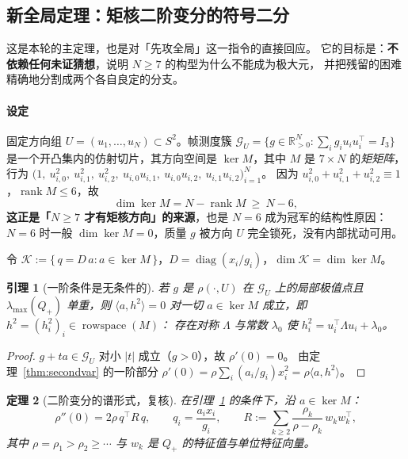 \documentclass[UTF8,11pt]{ctexart}
\newtheorem{theorem}{定理}[section]
\newtheorem{lemma}[theorem]{引理}
\theoremstyle{definition}
\newcommand{\Lam}{\Lambda}
\newcommand{\rank}{\operatorname{rank}}
\newcommand{\R}{\mathbb{R}}
\begin{document}
\subsection{新全局定理：矩核二阶变分的符号二分}\label{sec:r17:dichotomy}

这是本轮的主定理，也是对「先攻全局」这一指令的直接回应。
它的目标是：\textbf{不依赖任何未证猜想}，说明 $N\ge7$ 的构型为什么不能成为极大元，
并把残留的困难精确地分割成两个各自良定的分支。

\paragraph{设定}
固定方向组 $U=(u_1,\dots,u_N)\subset S^2$。帧测度簇
$\mathcal G_U=\{g\in\R^N_{>0}:\sum_ig_iu_iu_i^\top=I_3\}$
是一个开凸集内的仿射切片，其方向空间是
$\ker M$，其中 $M$ 是 $7\times N$ 的\emph{矩矩阵}，
行为 $\bigl(1,\ u_{i,0}^2,\ u_{i,1}^2,\ u_{i,2}^2,\ u_{i,0}u_{i,1},\ u_{i,0}u_{i,2},\ u_{i,1}u_{i,2}\bigr)_{i=1}^N$。
因为 $u_{i,0}^2+u_{i,1}^2+u_{i,2}^2\equiv1$，$\rank M\le6$，故
\begin{equation}\label{eq:kerdim}
\dim\ker M=N-\rank M\ \ge\ N-6 ,
\end{equation}
\textbf{这正是「$N\ge7$ 才有矩核方向」的来源}，也是 $N=6$ 成为冠军的结构性原因：
$N=6$ 时一般 $\dim\ker M=0$，质量 $g$ 被方向 $U$ 完全锁死，没有内部扰动可用。

令 $\mathcal K:=\{\,q=D\,a:a\in\ker M\,\}$，$D=\operatorname{diag}(x_i/g_i)$，$\dim\mathcal K=\dim\ker M$。

\begin{lemma}[一阶条件是无条件的]\label{lem:firstorder}
若 $g$ 是 $\rho(\cdot,U)$ 在 $\mathcal G_U$ 上的局部极值点且 $\lambda_{\max}(Q_+)$ 单重，则
$\langle a,h^2\rangle=0$ 对一切 $a\in\ker M$ 成立，即 $h^2=(h_i^2)_i\in\operatorname{rowspace}(M)$：
存在对称 $\Lam$ 与常数 $\lambda_0$ 使 $h_i^2=u_i^\top\!\Lam u_i+\lambda_0$。
\end{lemma}

\begin{proof}
$g+ta\in\mathcal G_U$ 对小 $|t|$ 成立（$g>0$），故 $\rho'(0)=0$。
由定理~\ref{thm:secondvar} 的一阶部分 $\rho'(0)=\rho\sum_i(a_i/g_i)x_i^2=\rho\langle a,h^2\rangle$。
\end{proof}

\begin{theorem}[二阶变分的谱形式，复核]\label{thm:secondvar2}
在引理~\ref{lem:firstorder} 的条件下，沿 $a\in\ker M$：
\begin{equation}\label{eq:secondvar2}
\rho''(0)=2\rho\,q^\top R\,q,\qquad q_i=\frac{a_ix_i}{g_i},\qquad
R:=\sum_{k\ge2}\frac{\rho_k}{\rho-\rho_k}\,w_kw_k^\top ,
\end{equation}
其中 $\rho=\rho_1>\rho_2\ge\cdots$ 与 $w_k$ 是 $Q_+$ 的特征值与单位特征向量。
\end{theorem}
\end{document}
